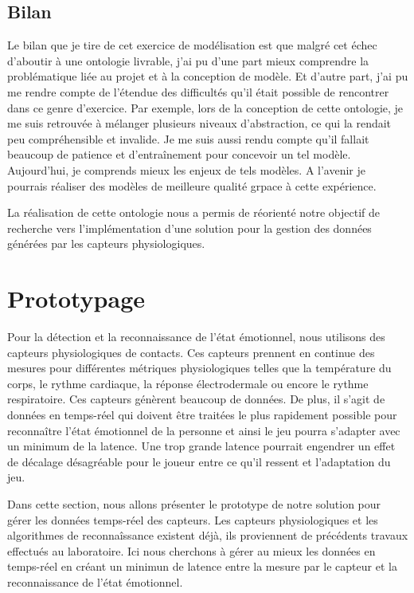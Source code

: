 \documentclass{article}
\begin{document}
	\subsection{Bilan}
		Le bilan que je tire de cet exercice de modélisation est que malgré cet échec d'aboutir à une ontologie livrable, j'ai pu d'une part mieux comprendre la problématique liée au projet et à la conception de modèle.
		Et d'autre part, j'ai pu me rendre compte de l'étendue des difficultés qu'il était possible de rencontrer dans ce genre d'exercice.
		Par exemple, lors de la conception de cette ontologie, je me suis retrouvée à mélanger plusieurs niveaux d'abstraction, ce qui la rendait peu compréhensible et invalide. 
		Je me suis aussi rendu compte qu'il fallait beaucoup de patience et d'entraînement pour concevoir un tel modèle. 
		Aujourd'hui, je comprends mieux les enjeux de tels modèles. 
		A l'avenir je pourrais réaliser des modèles de meilleure qualité grpace à cette expérience.\par
		La réalisation de cette ontologie nous a permis de réorienté notre objectif de recherche vers l'implémentation d'une solution pour la gestion des données générées par les capteurs physiologiques.

\section{Prototypage}
	Pour la détection et la reconnaissance de l'état émotionnel, nous utilisons des capteurs physiologiques de contacts.
	Ces capteurs prennent en continue des mesures pour différentes métriques physiologiques telles que la température du corps, le rythme cardiaque, la réponse électrodermale ou encore le rythme respiratoire.
	Ces capteurs génèrent beaucoup de données.
	De plus, il s'agit de données en temps-réel qui doivent être traitées le plus rapidement possible pour reconnaître l'état émotionnel de la personne et ainsi le jeu pourra s'adapter avec un minimum de la latence.
	Une trop grande latence pourrait engendrer un effet de décalage désagréable pour le joueur entre ce qu'il ressent et l'adaptation du jeu.\par
	Dans cette section, nous allons présenter le prototype de notre solution pour gérer les données temps-réel des capteurs.
	Les capteurs physiologiques et les algorithmes de reconnaîssance existent déjà, ils proviennent de précédents travaux effectués au laboratoire.
	Ici nous cherchons à gérer au mieux les données en temps-réel en créant un minimun de latence entre la mesure par le capteur et la reconnaissance de l'état émotionnel.
\end{document}
